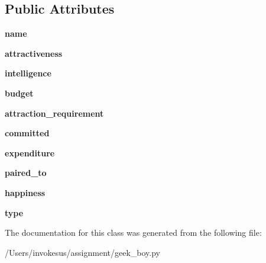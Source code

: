 \subsection*{Public Attributes}
\begin{DoxyCompactItemize}
\item 
\mbox{\label{classgeek__boy_1_1_geek___boy_a6c9ca7bc6b462250e768550a672db759}} 
{\bfseries name}
\item 
\mbox{\label{classgeek__boy_1_1_geek___boy_a03843bf99e532745dfcfcda585779110}} 
{\bfseries attractiveness}
\item 
\mbox{\label{classgeek__boy_1_1_geek___boy_a2c8a57c6e3b35b904b992aa764cbf759}} 
{\bfseries intelligence}
\item 
\mbox{\label{classgeek__boy_1_1_geek___boy_aafd75f742227ec6ca3911091671e888d}} 
{\bfseries budget}
\item 
\mbox{\label{classgeek__boy_1_1_geek___boy_af14e4f6d5e00e4f27ac60ba68a28af33}} 
{\bfseries attraction\+\_\+requirement}
\item 
\mbox{\label{classgeek__boy_1_1_geek___boy_aab19a0ea9c20343ef7d3a1e0d209c7fa}} 
{\bfseries committed}
\item 
\mbox{\label{classgeek__boy_1_1_geek___boy_a32e7bd57e5ed1595bd47d67a0fd40029}} 
{\bfseries expenditure}
\item 
\mbox{\label{classgeek__boy_1_1_geek___boy_a254e9ad875c879c22b8c45ed8a3dd601}} 
{\bfseries paired\+\_\+to}
\item 
\mbox{\label{classgeek__boy_1_1_geek___boy_a835570f9058c1e3326de0dd3d699de99}} 
{\bfseries happiness}
\item 
\mbox{\label{classgeek__boy_1_1_geek___boy_a3331fb6dfe37cf9913ab14b36b4aa205}} 
{\bfseries type}
\end{DoxyCompactItemize}


The documentation for this class was generated from the following file\+:\begin{DoxyCompactItemize}
\item 
/\+Users/invokesus/assignment/geek\+\_\+boy.\+py\end{DoxyCompactItemize}
